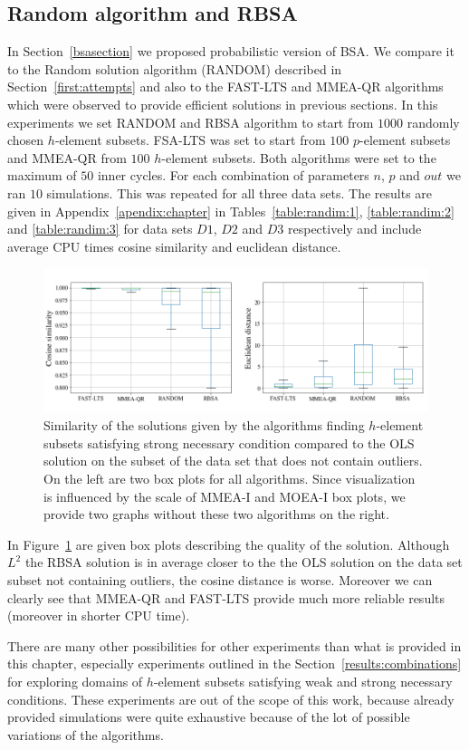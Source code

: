 \subsection{Random algorithm and RBSA}
In Section~\ref{bsasection} we proposed probabilistic version of BSA. We compare it to the Random solution algorithm (RANDOM) described in Section~\ref{first:attempts} and also to the FAST-LTS and MMEA-QR algorithms which were observed to provide efficient solutions in previous sections. In this experiments we set RANDOM and RBSA algorithm to start from $1000$ randomly chosen $h$-element subsets. FSA-LTS was set to start from $100$ $p$-element subsets and MMEA-QR from $100$ $h$-element subsets. Both algorithms were set to the maximum of $50$ inner cycles. For each combination of parameters $n$, $p$ and $out$ we ran $10$ simulations. This was repeated for all three data sets. The results are given in Appendix~\ref{apendix:chapter} in Tables~\ref{table:randim:1}, \ref{table:randim:2} and \ref{table:randim:3} for data sets $D1$, $D2$ and $D3$ respectively and include average CPU times cosine similarity and euclidean distance.

\begin{figure}[h]
    \centering
    \includegraphics[width=12cm]{img/random_box}

    \caption{Similarity of the solutions given by the algorithms finding $h$-element subsets satisfying strong necessary condition compared to the OLS solution on the subset of the data set that does not contain outliers. On the left are two box plots for all algorithms. Since visualization is influenced by the scale of MMEA-I and MOEA-I box plots, we provide two graphs without these two algorithms on the right.}
    \label{randim:box}
\end{figure}

In Figure~\ref{randim:box} are given box plots describing the quality of the solution. Although $L^2$ the RBSA solution is in average closer to the the OLS solution on the data set subset not containing outliers, the cosine distance is worse. Moreover we can clearly see that MMEA-QR and FAST-LTS provide much more reliable results (moreover in shorter CPU time).

There are many other possibilities for other experiments than what is provided in this chapter, especially experiments outlined in the Section~\ref{results:combinations} for exploring domains of $h$-element subsets satisfying weak and strong necessary conditions. These experiments are out of the scope of this work, because already provided simulations were quite exhaustive because of the lot of possible variations of the algorithms.  